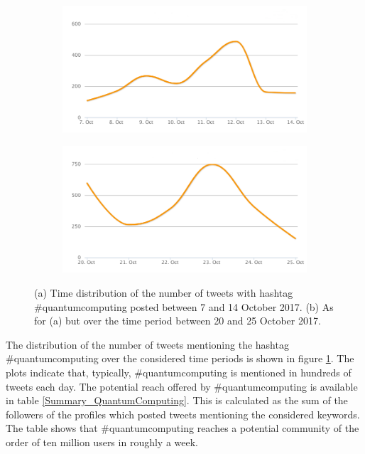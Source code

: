 \begin{figure}
 \centering
 \begin{subfigure}[t]{0.95\textwidth}
   \includegraphics[width=1\linewidth]{Images/FirstSearch_QuantumComputing.png}
   \caption{} 
 \end{subfigure}

 \begin{subfigure}[t]{0.95\textwidth}
   \includegraphics[width=1\linewidth]{Images/SecondSearch_QuantumComputing.png}
   \caption{}
 \end{subfigure}
 \caption{(a) Time distribution of the number of tweets with hashtag \#quantumcomputing posted between 7 and 14 October 2017. (b) As for (a) but over the time period between 20 and 25 October 2017.} 
 \label{First-SecondSearch_QuantumComputing}
\end{figure}

The distribution of the number of tweets mentioning the hashtag \#quantumcomputing over the considered time periods is shown in figure \ref{First-SecondSearch_QuantumComputing}. The plots indicate that, typically, \#quantumcomputing is mentioned in hundreds of tweets each day. The potential reach offered by \#quantumcomputing is available in table \ref{Summary_QuantumComputing}. This is calculated as the sum of the followers of the profiles which posted tweets mentioning the considered keywords. The table shows that \#quantumcomputing reaches a potential community of the order of ten million users in roughly a week.

